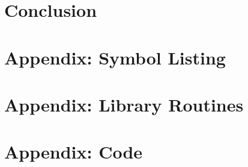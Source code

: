 \documentclass[11pt]{article}
\begin{document}
\section{Conclusion}

\appendix
\section{Appendix: Symbol Listing}

\section{Appendix: Library Routines}

\section{Appendix: Code}
\end{document}
